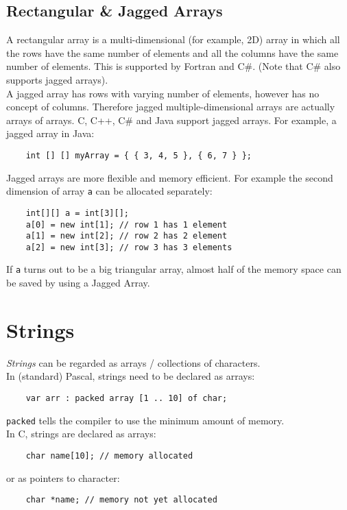 \subsection{Rectangular \& Jagged Arrays}
A rectangular array is a multi-dimensional (for example, 2D) array in which all the rows have the same number of elements and all the columns have the same number of elements. This is supported by Fortran and C\#. (Note that C\# also supports jagged arrays).\\

A jagged array has rows with varying number of elements, however has no concept of columns. Therefore jagged multiple-dimensional arrays are actually arrays of arrays. C, C++, C\# and Java support jagged arrays. For example, a jagged array in Java:
\begin{verbatim}
    int [] [] myArray = { { 3, 4, 5 }, { 6, 7 } };
\end{verbatim}
Jagged arrays are more flexible and memory efficient. For example the second dimension of array \verb|a| can be allocated separately:
\begin{verbatim}
    int[][] a = int[3][];
    a[0] = new int[1]; // row 1 has 1 element
    a[1] = new int[2]; // row 2 has 2 element
    a[2] = new int[3]; // row 3 has 3 elements
\end{verbatim}
If \verb|a| turns out to be a big triangular array, almost half of the memory space can be saved by using a Jagged Array.

\section{Strings}
\textit{Strings} can be regarded as arrays / collections of characters.\\

In (standard) Pascal, strings need to be declared as arrays:
\begin{verbatim}
    var arr : packed array [1 .. 10] of char;
\end{verbatim}
\verb|packed| tells the compiler to use the minimum amount of memory.\\

In C, strings are declared as arrays:
\begin{verbatim}
    char name[10]; // memory allocated
\end{verbatim}
or as pointers to character:
\begin{verbatim}
    char *name; // memory not yet allocated
\end{verbatim}

